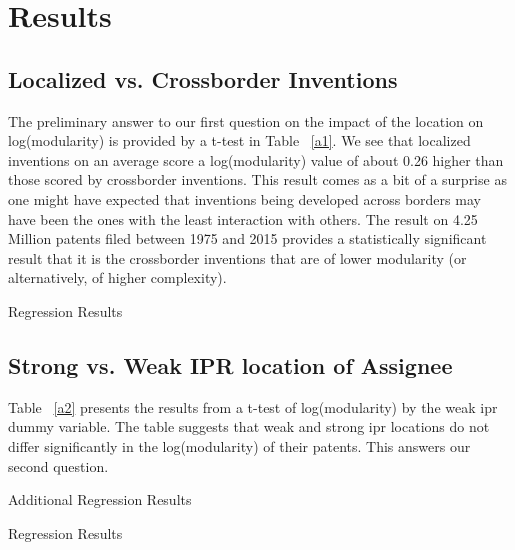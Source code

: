 \documentclass[12pt]{article}
\begin{document}
\section{Results}
\subsection{Localized vs. Crossborder Inventions}
The preliminary answer to our first question on the impact of the location on log(modularity) is provided by a t-test in Table ~\ref{a1}. We see that localized inventions on an average score a log(modularity) value of about 0.26 higher than those scored by crossborder inventions. This result comes as a bit of a surprise as one might have expected that inventions being developed across borders may have been the ones with the least interaction with others. The result on 4.25 Million patents filed between 1975 and 2015 provides a statistically significant result that it is the crossborder inventions that are of lower modularity (or alternatively, of higher complexity).


\begin{landscape}
\begin{table}
\caption{Regression Results}

\end{table}
\end{landscape}

\subsection{Strong vs. Weak IPR location of Assignee}
Table ~\ref{a2} presents the results from a t-test of log(modularity) by the weak ipr dummy variable. The table suggests that weak and strong ipr locations do not differ significantly in the log(modularity) of their patents. This answers our second question.

\begin{landscape}
\begin{table}
\caption{Additional Regression Results}

\end{table}
\end{landscape}

\begin{table}
\caption{Regression Results}

\end{table}
\end{document}
